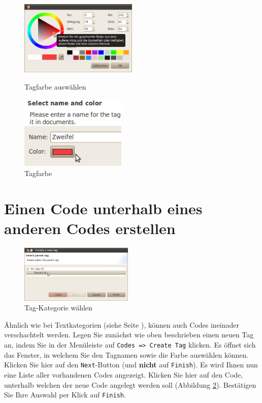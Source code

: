 \begin{figure}[!hb]
\begin{minipage}[!hb!]{0.5\textwidth}
	\centering
	 \includegraphics[width=0.5\textwidth]{img/tagfarbe}
	\caption{Tagfarbe auswählen}
	\label{fig:tagfarbe1}
\end{minipage}
\hfill
\begin{minipage}[!hb!]{0.5\textwidth}
	\centering
	 \includegraphics[width=0.45\textwidth]{img/tagfarbe2}
	\caption{Tagfarbe}
	\label{fig:tagfarbe2}
\end{minipage}
\end{figure}

\section{Einen Code unterhalb eines anderen Codes erstellen}
\begin{figure}
 \vspace{-28pt}
 \begin{center}
    \includegraphics[width=0.48\textwidth]{img/subtag}
	\caption{Tag-Kategorie wählen}
	\label{fig:subtag}
  \end{center}
  \vspace{12pt}
\end{figure}
Ähnlich wie bei Textkategorien (siehe Seite \pageref{sec:textcategory}), können auch Codes ineinader verschachtelt werden. 
Legen Sie zunächst wie oben beschrieben einen neuen Tag an, indem Sie in der Menüleiste auf \texttt{Codes => Create Tag} klicken. %
Es öffnet sich das Fenster, in welchem Sie den Tagnamen sowie die Farbe auswählen können. Klicken Sie hier auf den \texttt{Next}-Button %
(und \textbf{nicht} auf \texttt{Finish}). Es wird Ihnen nun eine Liste aller vorhandenen Codes angezeigt. Klicken Sie hier auf den %
Code, unterhalb welchen der neue Code angelegt werden soll (Abbildung \ref{fig:subtag}). Bestätigen Sie Ihre Auswahl per %
Klick auf \texttt{Finish}.\\[4mm] %

